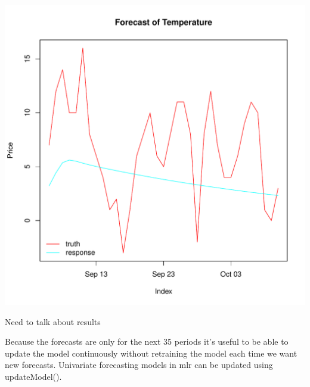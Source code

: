\documentclass{article}\usepackage[]{graphicx}\usepackage[]{color}
\makeatletter
\def\maxwidth{ %
  \ifdim\Gin@nat@width>\linewidth
    \linewidth
  \else
    \Gin@nat@width
  \fi
}
\newenvironment{knitrout}{}{} %
\theoremstyle{definition}
\newcommand\code{\@codex}
\def\@codex#1{{\normalfont\ttfamily\hyphenchar\font=-1 #1}}
\newcommand{\pkg}[1]{{\fontseries{b}\selectfont #1}}
\makeatother
\begin{document}
\begin{knitrout}
\color{fgcolor}
\includegraphics[width=\maxwidth]{figure/plotbatsTrain-1} 

\end{knitrout}

Need to talk about results

Because the forecasts are only for the next 35 periods it's useful to be able to update the model continuously without retraining the model each time we want new forecasts. Univariate forecasting models in \pkg{mlr} can be updated using \code{updateModel()}. 
\end{document}

